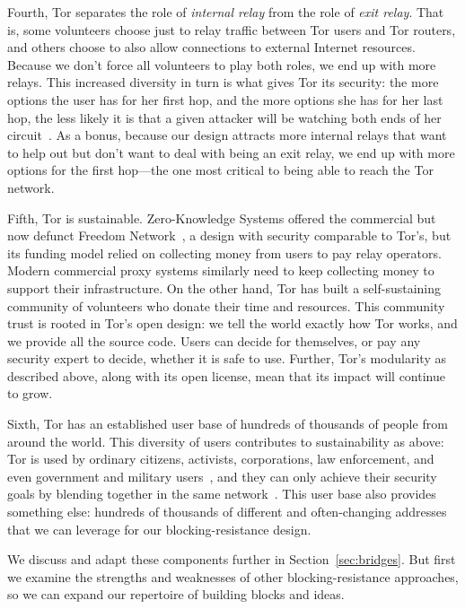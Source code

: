 \documentclass{llncs}
\begin{document}
Fourth, Tor separates the role of \emph{internal relay} from the
role of \emph{exit relay}. That is, some volunteers choose just to relay
traffic between Tor users and Tor routers, and others choose to also allow
connections to external Internet resources. Because we don't force all
volunteers to play both roles, we end up with more relays. This increased
diversity in turn is what gives Tor its security: the more options the
user has for her first hop, and the more options she has for her last hop,
the less likely it is that a given attacker will be watching both ends
of her circuit~\cite{tor-design}. As a bonus, because our design attracts
more internal relays that want to help out but don't want to deal with
being an exit relay, we end up with more options for the first hop---the
one most critical to being able to reach the Tor network.

Fifth, Tor is sustainable. Zero-Knowledge Systems offered the commercial
but now defunct Freedom Network~\cite{freedom21-security}, a design with
security comparable to Tor's, but its funding model relied on collecting
money from users to pay relay operators. Modern commercial proxy systems
similarly
need to keep collecting money to support their infrastructure. On the
other hand, Tor has built a self-sustaining community of volunteers who
donate their time and resources. This community trust is rooted in Tor's
open design: we tell the world exactly how Tor works, and we provide all
the source code. Users can decide for themselves, or pay any security
expert to decide, whether it is safe to use. Further, Tor's modularity
as described above, along with its open license, mean that its impact
will continue to grow.

Sixth, Tor has an established user base of hundreds of
thousands of people from around the world. This diversity of
users contributes to sustainability as above: Tor is used by
ordinary citizens, activists, corporations, law enforcement, and
even government and military users~\cite{tor-use-cases}, and they can
only achieve their security goals by blending together in the same
network~\cite{econymics,usability:weis2006}. This user base also provides
something else: hundreds of thousands of different and often-changing
addresses that we can leverage for our blocking-resistance design.

We discuss and adapt these components further in
Section~\ref{sec:bridges}. But first we examine the strengths and
weaknesses of other blocking-resistance approaches, so we can expand
our repertoire of building blocks and ideas.
\end{document}
